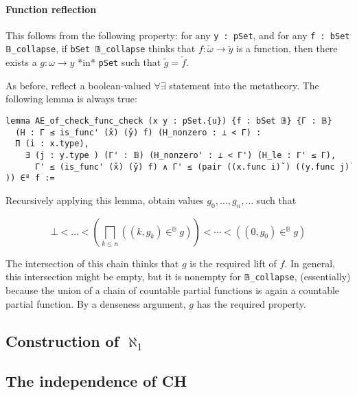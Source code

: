 \documentclass[sigplan,10pt,review, anonymous]{acmart}
\theoremstyle{definition}
\begin{document}
\paragraph{Function reflection}

This follows from the following property: for any \lstinline{y : pSet}, and for any \lstinline{f : bSet 𝔹_collapse}, if \lstinline{bSet 𝔹_collapse} thinks that \(f : \check{\omega}  \to \check{y}\) is a function, then there exists a \(g : \omega \to y\) *in* \lstinline{pSet} such that \(\check{g} = \check{f}\).

As before, reflect a boolean-valued \(\forall \exists\) statement into the metatheory. The following lemma is always true:
\begin{lstlisting}
lemma AE_of_check_func_check (x y : pSet.{u}) {f : bSet 𝔹} {Γ : 𝔹}
  (H : Γ ≤ is_func' (x̌) (y̌) f) (H_nonzero : ⊥ < Γ) :
  Π (i : x.type),
    ∃ (j : y.type ) (Γ' : 𝔹) (H_nonzero' : ⊥ < Γ') (H_le : Γ' ≤ Γ),
      Γ' ≤ (is_func' (x̌) (y̌) f) ∧ Γ' ≤ (pair ((x.func i)̌ ) ((y.func j)̌ )) ∈ᴮ f :=
\end{lstlisting}

Recursively applying this lemma, obtain values \(g_0, \dots, g_n, \dots\) such that

\[\bot < \dots < \left(\bigsqcap_{k \leq n} ((k, g_k) \in^{\mathbb{B}} g)\right) < \cdots < ((0 , g_0) \in^{\mathbb{B}} g)\]

The intersection of this chain thinks that \(g\) is the required lift of \(f\). In general, this intersection might be empty, but it is nonempty for \lstinline{𝔹_collapse}, (essentially) because the union of a chain of countable partial functions is again a countable partial function. By a denseness argument, \(g\) has the required property.



\subsection{Construction of $\aleph_1$} \label{subsection:forcing:aleph-1}


\subsection{The independence of CH} \label{subsection:forcing:independence}
\end{document}
